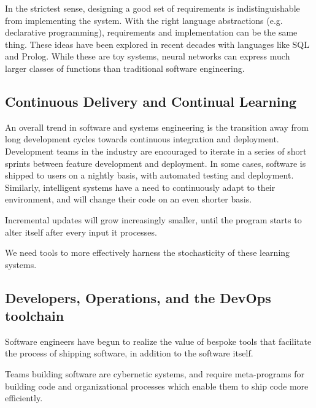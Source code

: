 \documentclass[12pt,initial,twoside,maitrise]{dms}
\numberwithin{equation}{section}
\numberwithin{table}{chapter}
\numberwithin{figure}{chapter}
\begin{document}
In the strictest sense, designing a good set of requirements is indistinguishable from implementing the system. With the right language abstractions (e.g. declarative programming), requirements and implementation can be the same thing. These ideas have been explored in recent decades with languages like SQL and Prolog. While these are toy systems, neural networks can express much larger classes of functions than traditional software engineering.

\subsection{Continuous Delivery and Continual Learning}

An overall trend in software and systems engineering is the transition away from long development cycles towards continuous integration and deployment. Development teams in the industry are encouraged to iterate in a series of short sprints between feature development and deployment. In some cases, software is shipped to users on a nightly basis, with automated testing and deployment. Similarly, intelligent systems have a need to continuously adapt to their environment, and will change their code on an even shorter basis.

Incremental updates will grow increasingly smaller, until the program starts to alter itself after every input it processes.

We need tools to more effectively harness the stochasticity of these learning systems.

\subsection{Developers, Operations, and the DevOps toolchain}

Software engineers have begun to realize the value of bespoke tools that facilitate the process of shipping software, in addition to the software itself.

Teams building software are cybernetic systems, and require meta-programs for building code and organizational processes which enable them to ship code more efficiently.



\end{document}
